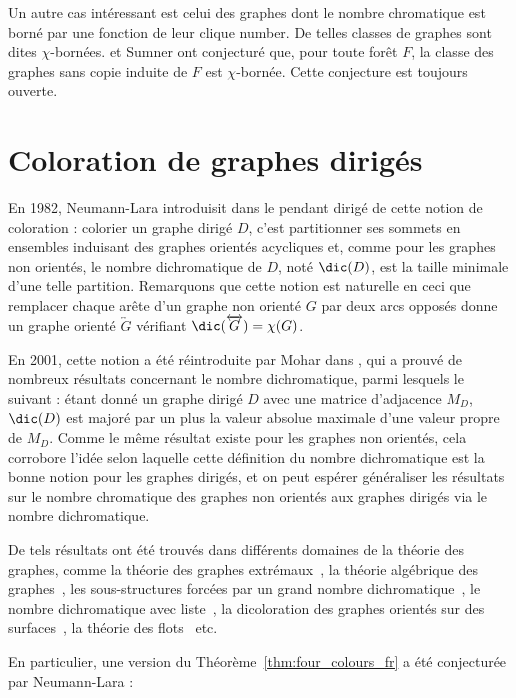 Un autre cas intéressant est celui des graphes dont le nombre chromatique est borné par une fonction de leur clique number. De telles classes de graphes sont dites $\chi$-bornées. \Gya et Sumner ont conjecturé que, pour toute forêt $F$, la classe des graphes sans copie induite de $F$ est $\chi$-bornée. Cette conjecture est toujours ouverte.

\section*{Coloration de graphes dirigés}

En 1982, Neumann-Lara introduisit dans \cite{NL82} le pendant dirigé de cette notion de coloration : colorier un graphe dirigé $D$, c'est partitionner ses sommets en ensembles induisant des graphes orientés acycliques et, comme pour les graphes non orientés, le nombre dichromatique de $D$, noté $\dic(D)$, est la taille minimale d'une telle partition. Remarquons que cette notion est naturelle en ceci que remplacer chaque arête d'un graphe non orienté $G$ par deux arcs opposés donne un graphe orienté $\overleftrightarrow{G}$ vérifiant $\dic(\overleftrightarrow{G}) = \chi(G)$.

En 2001, cette notion a été réintroduite par Mohar dans \cite{M03}, qui a prouvé de nombreux résultats concernant le nombre dichromatique, parmi lesquels le suivant : étant donné un graphe dirigé $D$ avec une matrice d'adjacence $M_D$, $\dic(D)$ est majoré par un plus la valeur absolue maximale d'une valeur propre de $M_D$. Comme le même résultat existe pour les graphes non orientés, cela corrobore l'idée selon laquelle cette définition du nombre dichromatique est la bonne notion pour les graphes dirigés, et on peut espérer généraliser les résultats sur le nombre chromatique des graphes non orientés aux graphes dirigés via le nombre dichromatique.

De tels résultats ont été trouvés dans différents domaines de la théorie des graphes, comme la théorie des graphes extrémaux~\cite{BBSS20, HK15, KS20}, la théorie algébrique des graphes~\cite{M10}, les sous-structures forcées par un grand nombre dichromatique~\cite{AAC21, ACN21, ACL19, hero, GSS20, HLNT19, S21}, le nombre dichromatique avec liste~\cite{BHL18, HM11}, la dicoloration des graphes orientés sur des surfaces~\cite{AHKR21, LM17, S19}, la théorie des flots~\cite{H17, KV12} etc.

En particulier, une version du Théorème~\ref{thm:four_colours_fr} a été conjecturée par Neumann-Lara :

